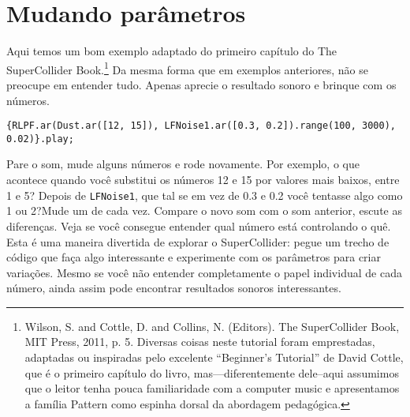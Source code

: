 \section{Mudando parâmetros}

Aqui temos um bom exemplo adaptado do primeiro capítulo do The SuperCollider Book.\footnote{
Wilson, S. and Cottle, D. and Collins, N. (Editors). The SuperCollider Book, MIT Press, 2011, p. 5. Diversas coisas neste tutorial foram emprestadas, adaptadas ou inspiradas pelo excelente “Beginner’s Tutorial” de David Cottle, que é o primeiro capítulo do livro, mas---diferentemente dele--aqui assumimos que o leitor tenha pouca familiaridade com a computer music e apresentamos a família Pattern como espinha dorsal da abordagem pedagógica.
} Da mesma forma que em exemplos anteriores, não se preocupe em entender tudo. Apenas aprecie o resultado sonoro e brinque com os números.


\begin{lstlisting}[style=SuperCollider-IDE, basicstyle=\scttfamily\footnotesize]
{RLPF.ar(Dust.ar([12, 15]), LFNoise1.ar([0.3, 0.2]).range(100, 3000), 0.02)}.play;
\end{lstlisting}

Pare o som, mude alguns números e rode novamente. Por exemplo, o que acontece quando você substitui os números 12 e 15 por valores mais baixos, entre 1 e 5? Depois de \texttt{LFNoise1}, que tal se em vez de 0.3 e 0.2 você tentasse algo como 1 ou 2?Mude um de cada vez. Compare o novo som com o som anterior, escute as diferenças. Veja se você consegue entender qual número está controlando o quê. Esta é uma maneira divertida de explorar o SuperCollider: pegue um trecho de código que faça algo interessante e experimente com os parâmetros para criar variações. Mesmo se você não entender completamente o papel individual de cada número, ainda assim pode encontrar resultados sonoros interessantes.

\bigskip 
{}
